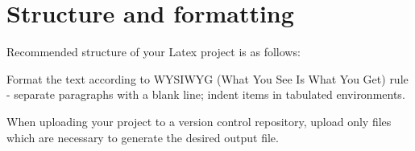 \section{Structure and formatting}
\label{sec:structure}
 
Recommended structure of your Latex project is as follows: 


Format the text according to WYSIWYG (What You See Is What You Get) rule - separate paragraphs with a blank line; indent items in tabulated environments.

When uploading your project to a version control repository, upload only files which are necessary to 
generate the desired output file. 
